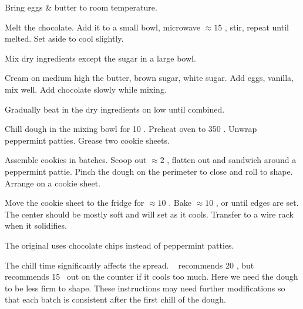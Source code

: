 \begin{preparation}
\item Bring eggs \& butter to room temperature.

\item Melt the chocolate.
	Add it to a small bowl, microwave $\approx 15$ \second, stir, repeat until melted.
	Set aside to cool slightly.

\item Mix dry ingredients except the sugar in a large bowl.

\item Cream on medium high the butter, brown sugar, white sugar.
	Add eggs, vanilla, mix well.
	Add chocolate slowly while mixing.

\item Gradually beat in the dry ingredients on low until combined.

\item Chill dough in the mixing bowl for 10 \minute.
	Preheat oven to 350 \Fahrenheit.
	Unwrap peppermint patties.
	Grease two cookie sheets.

\item Assemble cookies in batches.
	Scoop out $\approx2$ \Tablespoon, flatten out and sandwich around a peppermint pattie.
	Pinch the dough on the perimeter to close and roll to shape.
	Arrange on a cookie sheet.

\item Move the cookie sheet to the fridge for $\approx 10$ \minute.
	Bake $\approx 10$ \minute, or until edges are set.
	The center should be mostly soft and will set as it cools.
	Transfer to a wire rack when it solidifies.
\end{preparation}

\begin{variation}
\item The original uses chocolate chips instead of peppermint patties.
\end{variation}


\begin{experiments}
\item The chill time significantly affects the spread.
	\citeauthor{sallyBrownies2020}~\cite{sallyBrownies2020} recommends 20 \minute, but recommends 15 \minute~out on the counter if it cools too much.
	Here we need the dough to be less firm to shape.
	These instructions may need further modifications so that each batch is consistent after the first chill of the dough.
\end{experiments}


\recipeend%
